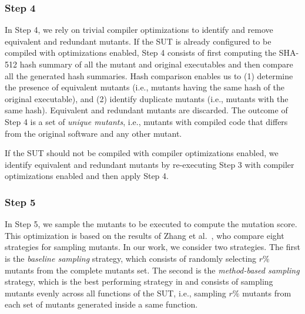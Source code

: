 \subsubsection{Step 4}

In Step 4, we rely on trivial compiler optimizations to identify and remove equivalent and redundant mutants. 
If the SUT is already configured to be compiled with optimizations enabled, Step 4 consists of first computing the SHA-512 hash summary of all the mutant and original executables and then compare all the generated hash summaries. Hash comparison enables us to (1) determine the presence of equivalent mutants (i.e., mutants having the same hash of the original executable), and (2) identify duplicate mutants (i.e., mutants with the same hash). %
Equivalent and redundant mutants are discarded.
The outcome of Step 4 is a set of \emph{unique mutants}, i.e., mutants with compiled code that differs from the original software and any other mutant.

If the SUT should not be compiled with compiler optimizations enabled, we identify equivalent and redundant mutants by re-executing Step 3 with compiler optimizations enabled and then apply Step 4.

\subsubsection{Step 5}

In Step 5, we sample the mutants to be executed to compute the mutation score. This optimization is based on the results of Zhang et al.~\cite{zhang2013operator}, who compare eight strategies for sampling mutants. In our work, we consider two strategies. The first is the \emph{baseline sampling} strategy, which consists of randomly selecting $r\%$ mutants from the complete mutants set. The second is the \emph{method-based sampling} strategy, which is the best performing strategy in \cite{zhang2013operator} and consists of sampling mutants evenly across all functions of the SUT, i.e., sampling $r\%$ mutants from each set of mutants generated inside a same function.

